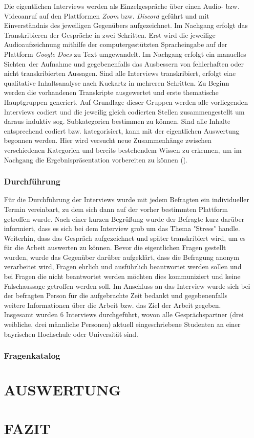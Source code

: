 \documentclass[10pt]{article}
\newcommand{\zit}[1]{(\cite{#1})}
\begin{document}
Die eigentlichen Interviews werden als Einzelgespräche über einen Audio- bzw. Videoanruf auf den Plattformen \textit{Zoom} bzw. \textit{Discord} geführt und mit Einverständnis des jeweiligen Gegenübers aufgezeichnet. 
Im Nachgang erfolgt das Transkribieren der Gespräche in zwei Schritten. Erst wird die jeweilige Audioaufzeichnung mithilfe der computergestützten Spracheingabe auf der Plattform \textit{Google Docs} zu Text umgewandelt. Im Nachgang erfolgt ein manuelles \grqq Sichten\grqq\ der Aufnahme und gegebenenfalls das Ausbessern von fehlerhaften oder nicht transkribierten Aussagen. 
Sind alle Interviews transkribiert, erfolgt eine qualitative Inhaltsanalyse nach Kuckartz in mehreren Schritten. Zu Beginn werden die vorhandenen Transkripte ausgewertet und erste thematische Hauptgruppen generiert. Auf Grundlage dieser Gruppen werden alle vorliegenden Interviews codiert und die jeweilig gleich codierten Stellen zusammengestellt um daraus induktiv sog. Subkategorien bestimmen zu können. Sind alle Inhalte entsprechend codiert bzw. kategorisiert, kann mit der eigentlichen Auswertung begonnen werden. Hier wird versucht neue Zusammenhänge zwischen verschiedenen Kategorien und bereits bestehendem Wissen zu erkennen, um im Nachgang die Ergebnispräsentation vorbereiten zu können \zit{Inhaltsanalyse}.

\subsubsection{Durchführung}
Für die Durchführung der Interviews wurde mit jedem Befragten ein individueller Termin vereinbart, zu dem sich dann auf der vorher bestimmten Plattform getroffen wurde. Nach einer kurzen Begrüßung wurde der Befragte kurz darüber informiert, dass es sich bei dem Interview grob um das Thema "Stress" handle. Weiterhin, dass das Gespräch aufgezeichnet und später transkribiert wird, um es für die Arbeit auswerten zu können. Bevor die eigentlichen Fragen gestellt wurden, wurde das Gegenüber darüber aufgeklärt, dass die Befragung anonym verarbeitet wird, Fragen ehrlich und ausführlich beantwortet werden sollen und bei Fragen die nicht beantwortet werden möchten dies kommuniziert und keine Falschaussage getroffen werden soll. Im Anschluss an das Interview wurde sich bei der befragten Person für die aufgebrachte Zeit bedankt und gegebenenfalls weitere Informationen über die Arbeit bzw. das Ziel der Arbeit gegeben.
Insgesamt wurden 6 Interviews durchgeführt, wovon alle Gesprächspartner (drei weibliche, drei männliche Personen) aktuell eingeschriebene Studenten an einer bayrischen Hochschule oder Universität sind. 

\subsubsection{Fragenkatalog}

\section{AUSWERTUNG}
\section{FAZIT}

\nocite{*}
\printbibliography
\end{document}
